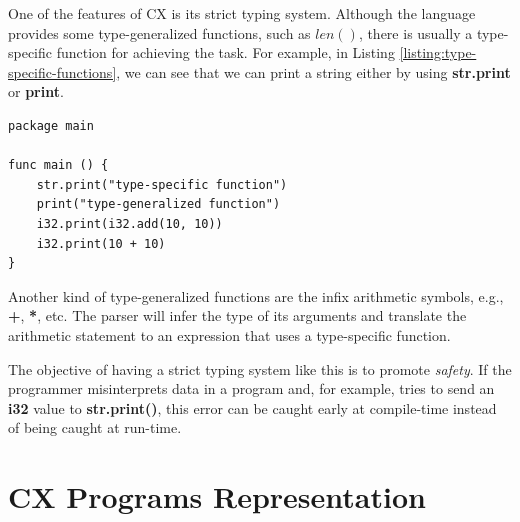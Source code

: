\documentclass[11pt,fleqn,openany]{book} %
\begin{document}
One of the features of CX is its strict typing system. Although the language provides some type-generalized functions, such as $len()$, there is usually a type-specific function for achieving the task. For example, in Listing \ref{listing:type-specific-functions}, we can see that we can print a string either by using \textbf{str.print} or \textbf{print}.

\begin{lstlisting}[caption={Type-Specific Functions},captionpos=b,label={listing:type-specific-functions}]
package main

func main () {
 	str.print("type-specific function")
    print("type-generalized function")
    i32.print(i32.add(10, 10))
    i32.print(10 + 10)
}
\end{lstlisting}

Another kind of type-generalized functions are the infix arithmetic symbols, e.g., \textbf{+}, \textbf{*}, etc. The parser will infer the type of its arguments and translate the arithmetic statement to an expression that uses a type-specific function.

The objective of having a strict typing system like this is to promote \emph{safety}. If the programmer misinterprets data in a program and, for example, tries to send an \textbf{i32} value to \textbf{str.print()}, this error can be caught early at compile-time instead of being caught at run-time.


\chapter{CX Programs Representation}
\label{chapter:cx-programs-representation}
\end{document}
